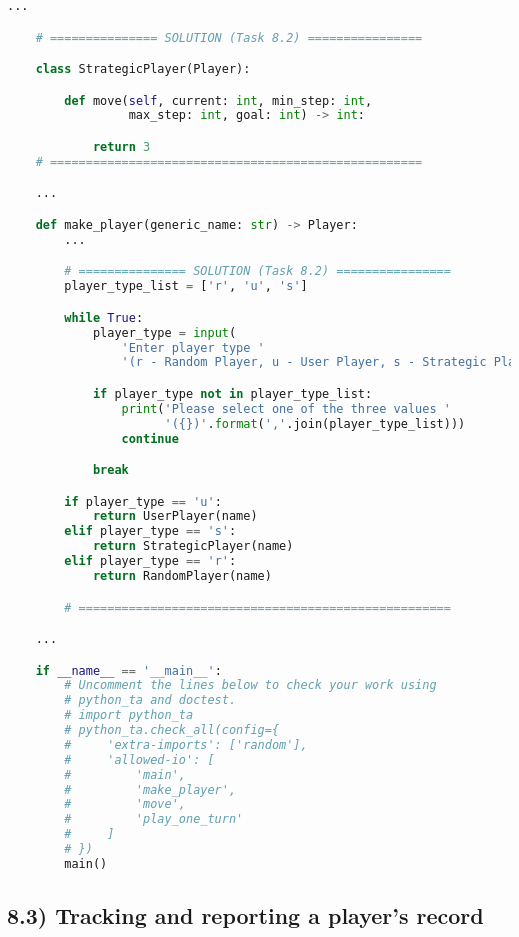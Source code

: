 \documentclass[12pt]{article}
\begin{document}
\begin{lstlisting}[language=Python]
    ...

    # =============== SOLUTION (Task 8.2) ================

    class StrategicPlayer(Player):

        def move(self, current: int, min_step: int,
                 max_step: int, goal: int) -> int:

            return 3
    # ====================================================

    ...

    def make_player(generic_name: str) -> Player:
        ...

        # =============== SOLUTION (Task 8.2) ================
        player_type_list = ['r', 'u', 's']

        while True:
            player_type = input(
                'Enter player type '
                '(r - Random Player, u - User Player, s - Strategic Player)')

            if player_type not in player_type_list:
                print('Please select one of the three values '
                      '({})'.format(','.join(player_type_list)))
                continue

            break

        if player_type == 'u':
            return UserPlayer(name)
        elif player_type == 's':
            return StrategicPlayer(name)
        elif player_type == 'r':
            return RandomPlayer(name)

        # ====================================================

    ...

    if __name__ == '__main__':
        # Uncomment the lines below to check your work using
        # python_ta and doctest.
        # import python_ta
        # python_ta.check_all(config={
        #     'extra-imports': ['random'],
        #     'allowed-io': [
        #         'main',
        #         'make_player',
        #         'move',
        #         'play_one_turn'
        #     ]
        # })
        main()
\end{lstlisting}

\subsection*{8.3) Tracking and reporting a player’s record}

\bigskip
\end{document}
